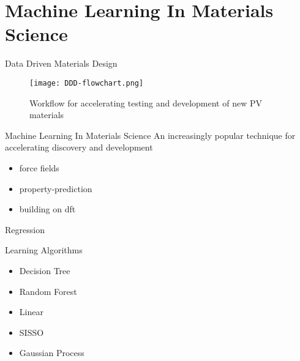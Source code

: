 \documentclass[10pt, aspectratio=169, presentation]{beamer}
\begin{document}
\section{Machine Learning In Materials Science}
\label{sec:org0931430}
\begin{frame}[label={sec:org964a9a9}]{Data Driven Materials Design}
\begin{figure}[htbp]
\centering
\texttt{[image: DDD-flowchart.png]}
\caption{Workflow for accelerating testing and development of new PV materials\autocite{yang-2023-high-throug,pablo-2019-new-front}}
\end{figure}
\end{frame}

\begin{frame}[label={sec:org2e28c9b}]{Machine Learning In Materials Science}
An increasingly popular technique for accelerating discovery and
development\autocite{pablo-2019-new-front}
\begin{itemize}
\item force fields
\item property-prediction
\item building on dft
\end{itemize}
\end{frame}
\begin{frame}[label={sec:org8e08a8c}]{Regression}
\end{frame}

\begin{frame}[label={sec:orgcab7d15}]{Learning Algorithms}
\begin{itemize}
\item Decision Tree
\item Random Forest
\item Linear
\item SISSO
\item Gaussian Process
\end{itemize}
\end{frame}
\end{document}
